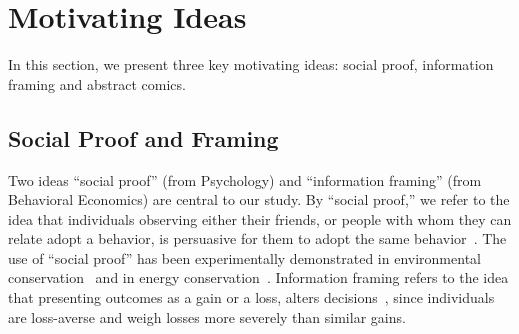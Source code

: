 
\section{Motivating Ideas}
\label{sec:Motivating Ideas}
In this section, we present three key motivating ideas: social proof, information framing and abstract comics.

\subsection{Social Proof and Framing}
Two ideas ``social proof'' (from Psychology) and ``information framing'' (from Behavioral Economics) are central to our study. By ``social proof,'' we refer to the idea that individuals observing either their friends, or people with whom they can relate adopt a behavior, is persuasive for them to adopt the same behavior~\textcite{Cialdini1993,Cialdini2004}. The use of ``social proof'' has been experimentally demonstrated in environmental conservation~\textcite{goldstein2008room} and in energy conservation~\textcite{schultz2007constructive}. Information framing refers to the idea that presenting outcomes as a gain or a loss, alters decisions~\textcite{tversky1981framing,tversky1992advances}, since individuals are loss-averse and weigh losses more severely than similar gains.


